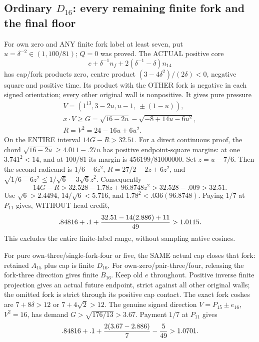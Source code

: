 \documentclass[11pt]{article}
\begin{document}
\subsection{Ordinary \(D_{16}\): every remaining finite fork and the final floor}
\label{app:arithD16ordinaryfinish}

For own zero and ANY finite fork
label at least seven, put
\(u=\delta^{-2}\in(1,100/81)\);
\(Q=0\) was proved.
The ACTUAL positive core
\[
                     c+\delta^{-1}n_f+
                                     2(\delta^{-1}-\delta)n_{14}
\]
has cap/fork products zero, centre
product \((3-4\delta^2)/(2\delta)<0\),
negative square and positive time.
Its product with the OTHER fork is
negative in each signed orientation;
every other original wall is nonpositive.
It gives pure pressure
\[
 \begin{gathered}
 V=(1^{13},3-2u,u-1,\ \pm(1-u)),\\
 x\cdot V\ge G=\sqrt{16-2u}-\sqrt{-8+14u-6u^2},\\
                              R=V^2=24-16u+6u^2 .
 \end{gathered}
\]
On the ENTIRE interval \(14G-R>32.51\).
For a direct continuous proof, the chord
\(\sqrt{16-2u}\ge4.011-.27u\)
has positive endpoint-square margins:
at one \(3.741^2<14\), and at
\(100/81\) its margin is
\(456199/81000000\).
Set \(z=u-7/6\).
Then the second radicand is \(1/6-6z^2\),
\(R=27/2-2z+6z^2\), and
\(\sqrt{1/6-6z^2}\le1/\sqrt6-3\sqrt6z^2\).
Consequently
\[
 14G-R>32.528-1.78z+96.8748z^2
                     >32.528-.009>32.51 .
\]
Use \(\sqrt6>2.4494\), \(14/\sqrt6<5.716\),
and \(1.78^2<.036(96.8748)\).
Paying \(1/7\) at \(P_{11}\) gives,
WITHOUT head credit,
\[
              .84816+.1+{32.51-14(2.886)+11\over49}
                              >1.0115 .
\]
This excludes the entire finite-label
range, without sampling native cosines.

For pure own-three/single-fork-four
or five, the SAME actual cap closes
that fork: retained \(A_{15}\) plus
cap is finite \(D_{16}\).
For own-zero/pair-three/four, releasing
the fork-three direction gives finite
\(B_{16}\).
Keep old \(e\) throughout.
Positive inverse finite projection gives
an actual future endpoint, strict against
all other original walls; the omitted
fork is strict through its positive
cap contact.
The exact fork coshes are
\(7+8\delta>12\) or \(7+4\sqrt2>12\).
The genuine signed direction
\(V=P_{15}\pm e_{16}\), \(V^2=16\),
has demand \(G>\sqrt{176/13}>3.67\).
Payment \(1/7\) at \(P_{11}\) gives
\[
                  .84816+.1+{2(3.67-2.886)\over7}-{5\over49}>1.0701 .
\]
\end{document}
